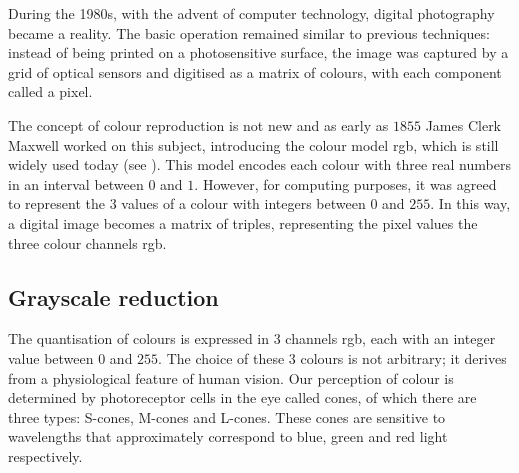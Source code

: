 \noindent During the 1980s, with the advent of computer technology, digital photography became a reality. The basic operation remained similar to previous techniques: instead of being printed on a photosensitive surface, the image was captured by a grid of optical sensors and digitised as a matrix of colours, with each component called a pixel.

\noindent The concept of colour reproduction is not new and as early as $1855$ James Clerk Maxwell worked on this subject, introducing the colour model \gls{rgb}, which is still widely used today (see \cite{MaxWell_Colours}). This model encodes each colour with three real numbers in an interval between $0$ and $1$. However, for computing purposes, it was agreed to represent the $3$ values of a colour with integers between $0$ and $255$. In this way, a digital image becomes a matrix of triples, representing the pixel values the three colour channels \gls{rgb}.

\subsection{Grayscale reduction}
The quantisation of colours is expressed in $3$ channels \gls{rgb}, each with an integer value between $0$ and $255$. The choice of these $3$ colours is not arbitrary; it derives from a physiological feature of human vision. Our perception of colour is determined by photoreceptor cells in the eye called cones, of which there are three types: S-cones, M-cones and L-cones. These cones are sensitive to wavelengths that approximately correspond to blue, green and red light respectively.

